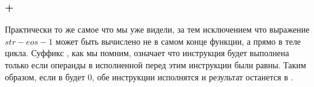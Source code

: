 \subsubsection{\OptimizingKeil{} + \ARMMode}



Практически то же самое что мы уже видели, за тем исключением что выражение $str - eos - 1$ может быть вычислено
не в самом конце функции, а прямо в теле цикла. Суффикс , как мы помним, означает что инструкция будет выполнена только
если операнды в исполненной перед этим инструкции \CMP были равны. 
Таким образом, если в \Rzero будет 0, обе инструкции  исполнятся и результат останется в \Rzero.

